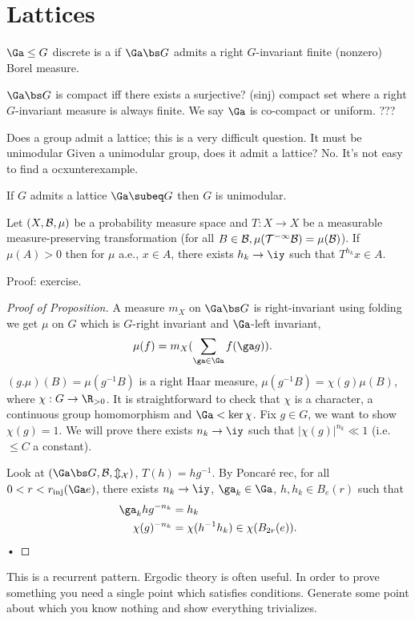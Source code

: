 \section{Lattices}
\begin{df}
$\Ga\le G$ discrete is a  if $\Ga\bs G$ admits a right $G$-invariant finite (nonzero) Borel measure.
\end{df}
\begin{rem}
$\Ga\bs G$ is compact iff there exists a surjective? (sinj) compact set where  a right $G$-invariant measure is always finite. We say  $\Ga$ is co-compact or uniform. 
???
\end{rem}
Does a group admit a lattice; this is a very difficult question. It must be unimodular
Given a unimodular group, does it admit a lattice? No. It's not easy to find a ocxunterexample.
\begin{pr}
If $G$ admits a lattice $\Ga \subeq G$ then $G$ is unimodular.
\end{pr}
\begin{thm}
Let $(X,\cal B, \mu)$ be a probability measure space and $T:X\to X$ be a measurable measure-preserving transformation (for all $B\in \cal B, \mu(T^{-1}B) = \mu(B)$). 
If $\mu(A)>0$ then for $\mu$ a.e., $x\in A$, there exists $h_k\to \iy$ such that $T^{h_k}x\in A$. 
\end{thm}
Proof: exercise.
\begin{proof}[Proof of Proposition]
A measure $m_X$ on $\Ga\bs G$ is right-invariant using folding we get $\mu$ on $G$ which is $G$-right invariant and $\Ga$-left invariant,
\begin{align}
\mu(f) &= m_X(\sum_{\ga\in \Ga}  f(\ga g)).
\end{align}
$(g.\mu)(B) = \mu(g^{-1}B)$ is a right Haar measure, $\mu(g^{-1}B)=\chi(g) \mu(B)$, where $\chi:G\to \R_{>0}$. It is straightforward to check that $\chi$ is a character, a continuous group homomorphism and $\Ga < \ker \chi$. Fix $g\in G$, we want to show $\chi(g)=1$. %
We will prove there exists $n_k\to \iy$ such that $|\chi(g)|^{n_k}\ll 1$ (i.e. $\le C$ a constant). 

Look at $(\Ga \bs G, \cal B, m_X)$, $T(h)=hg^{-1}$. By Poncar\'e rec, for all $0<r<r_{\text{inj}}(\Ga e)$, there exists $n_k\to \iy$, $\ga_k\in \Ga$, $h,h_k\in B_e(r)$ such that 
\begin{align}
\ga_k h g^{-n_k} &= h_k\\
\chi(g)^{-n_k} &= \chi(h^{-1} h_k) \in \chi(B_{2r}(e)).
\end{align}•
\end{proof}
This is a recurrent pattern. Ergodic theory is often useful. In order to prove something you need a single point which satisfies conditions. Generate some point about which you know nothing and show everything trivializes.